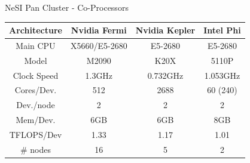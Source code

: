 \documentclass[final,t]{beamer}
\begin{document}
\begin{frame}[fragile]{}
\begin{columns}[t]
\begin{column}{.32\linewidth}
      \begin{block}{NeSI Pan Cluster - Co-Processors}
        \vspace*{-2ex}
      \begin{center}
      \begin{tabular}{|c|c|c|c|}
      \hline 
      \textbf{Architecture} & \textbf{Nvidia Fermi} & \textbf{Nvidia Kepler} & \textbf{Intel Phi} \\ 
      \hline 
      Main CPU                  &  X5660/E5-2680       &  E5-2680                   &  E5-2680 \\
      \hline 
      Model                       &  M2090                     &   K20X                       &  5110P \\ 
      \hline 
      Clock Speed             &  1.3GHz                    &  0.732GHz                      &  1.053GHz\\ 
      \hline 
      Cores/Dev.             & 512                            & 2688                           & 60 (240) \\ 
      \hline       
      Dev./node              &  2                             &   2                                &  2  \\ 
      \hline 
      Mem/Dev.             & 6GB                          & 6GB                               & 8GB  \\ 
      \hline 
      TFLOPS/Dev         & 1.33                          & 1.17                              & 1.01 \\ 
      \hline 
      \# nodes               & 16                             & 5                                 & 2 \\ 
      \hline 
      \end{tabular} 
      \end{center}
        \vspace*{-2ex}
      \end{block}



\end{column}
\end{columns}
\end{frame}
\end{document}
